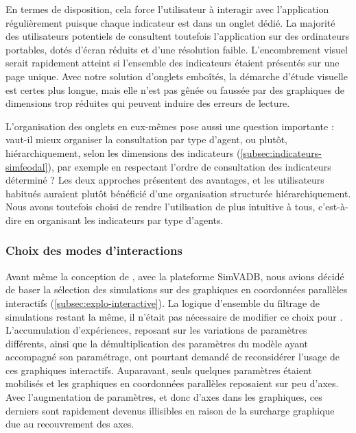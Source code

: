 En termes de disposition, cela force l'utilisateur à interagir avec l'application régulièrement puisque chaque indicateur est dans un onglet dédié.
La majorité des utilisateurs potentiels de \simedb{} consultent toutefois l'application sur des ordinateurs portables, dotés d'écran réduits et d'une résolution faible.
L'encombrement visuel serait rapidement atteint si l'ensemble des indicateurs étaient présentés sur une page unique.
Avec notre solution d'onglets emboîtés, la démarche d'étude visuelle est certes plus longue, mais elle n'est pas gênée ou faussée par des graphiques de dimensions trop réduites qui peuvent induire des erreurs de lecture.


L'organisation des onglets en eux-mêmes pose aussi une question importante : vaut-il mieux organiser la consultation par type d'agent, ou plutôt, hiérarchiquement, selon les \og dimensions\fg{} des indicateurs (\cref{subsec:indicateurs-simfeodal}), par exemple en respectant l'ordre de consultation des indicateurs déterminé ?
Les deux approches présentent des avantages, et les utilisateurs habitués auraient plutôt bénéficié d'une organisation structurée hiérarchiquement.
Nous avons toutefois choisi de rendre l'utilisation de \simedb{} plus intuitive à tous, c'est-à-dire en organisant les indicateurs par type d'agents.

\subsubsection{Choix des modes d'interactions \label{sssec:modes-interaction}}

Avant même la conception de \simedb{}, avec la plateforme SimVADB, nous avions décidé de baser la sélection des simulations sur des graphiques en coordonnées parallèles interactifs (\cref{subsec:explo-interactive}).
La logique d'ensemble du filtrage de simulations restant la même, il n'était pas nécessaire de modifier ce choix pour \simedb{}.
L'accumulation d'expériences, reposant sur les variations de paramètres différents, ainsi que la démultiplication des paramètres du modèle \simfeodal{} ayant accompagné son paramétrage, ont pourtant demandé de reconsidérer l'usage de ces graphiques interactifs.
Auparavant, seuls quelques paramètres étaient mobilisés et les graphiques en coordonnées parallèles reposaient sur peu d'axes.
Avec l'augmentation de paramètres, et donc d'axes dans les graphiques, ces derniers sont rapidement devenus illisibles en raison de la surcharge graphique due au recouvrement des axes.

